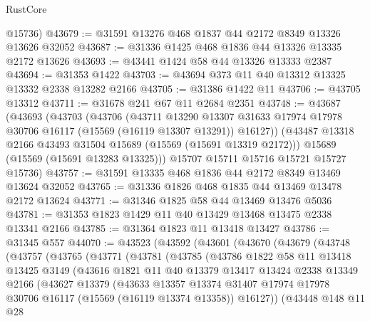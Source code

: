\begin{lexlean}{RustCore}
\begin{coremodule}
      @15736)
@43679 := @31591 @13276 @468 @1837 @44 @2172 @8349 @13326 @13626 @32052
@43687 := @31336 @1425 @468 @1836 @44 @13326 @13335 @2172 @13626
@43693 := @43441 @1424 @58 @44 @13326 @13333 @2387
@43694 := @31353 @1422
@43703 := @43694 @373 @11 @40 @13312 @13325 @13332 @2338 @13282 @2166
@43705 := @31386 @1422 @11
@43706 := @43705 @13312
@43711 := @31678 @241 @67 @11 @2684 @2351
@43748 := @43687
    (@43693
      (@43703
        (@43706
          (@43711
            @13290
            @13307
            @31633
            @17974
            @17978
            @30706
            @16117
            (@15569 (@16119 @13307 @13291))
            @16127))
        (@43487 @13318 @2166 @43493 @31504 @15689 (@15569 (@15691 @13319 @2172)))
        @15689
        (@15569 (@15691 @13283 @13325)))
      @15707
      @15711
      @15716
      @15721
      @15727
      @15736)
@43757 := @31591 @13335 @468 @1836 @44 @2172 @8349 @13469 @13624 @32052
@43765 := @31336 @1826 @468 @1835 @44 @13469 @13478 @2172 @13624
@43771 := @31346 @1825 @58 @44 @13469 @13476 @5036
@43781 := @31353 @1823 @1429 @11 @40 @13429 @13468 @13475 @2338 @13341 @2166
@43785 := @31364 @1823 @11 @13418 @13427
@43786 := @31345 @557
@44070 := @43523
    (@43592
      (@43601
        (@43670
          (@43679
            (@43748
              (@43757
                (@43765
                  (@43771
                    (@43781
                      (@43785
                        (@43786
                          @1822
                          @58
                          @11
                          @13418
                          @13425
                          @3149
                          (@43616
                            @1821
                            @11
                            @40
                            @13379
                            @13417
                            @13424
                            @2338
                            @13349
                            @2166
                            (@43627
                              @13379
                              (@43633
                                @13357
                                @13374
                                @31407
                                @17974
                                @17978
                                @30706
                                @16117
                                (@15569 (@16119 @13374 @13358))
                                @16127))
                            (@43448
                              @148
                              @11
                              @28

\end{coremodule}
\end{lexlean}
